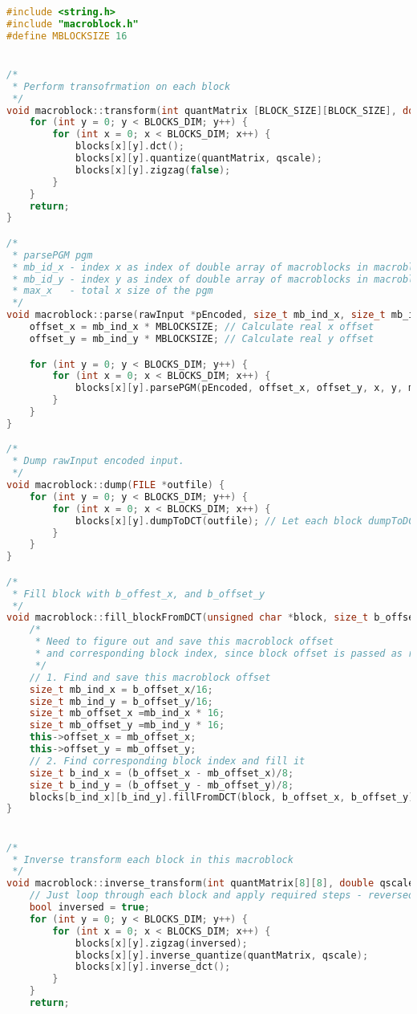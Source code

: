 \documentclass{report}
\begin{document}
\begin{lstlisting}[language=C++]
#include <string.h>
#include "macroblock.h"
#define MBLOCKSIZE 16


/*
 * Perform transofrmation on each block
 */
void macroblock::transform(int quantMatrix [BLOCK_SIZE][BLOCK_SIZE], double qscale) {
    for (int y = 0; y < BLOCKS_DIM; y++) {
        for (int x = 0; x < BLOCKS_DIM; x++) {
            blocks[x][y].dct();
            blocks[x][y].quantize(quantMatrix, qscale);
            blocks[x][y].zigzag(false);
        }
    }
    return;
}

/*
 * parsePGM pgm
 * mb_id_x - index x as index of double array of macroblocks in macroblocks manager
 * mb_id_y - index y as index of double array of macroblocks in macroblocks manager
 * max_x   - total x size of the pgm
 */
void macroblock::parse(rawInput *pEncoded, size_t mb_ind_x, size_t mb_ind_y, size_t max_x) {
    offset_x = mb_ind_x * MBLOCKSIZE; // Calculate real x offset
    offset_y = mb_ind_y * MBLOCKSIZE; // Calculate real y offset

    for (int y = 0; y < BLOCKS_DIM; y++) {
        for (int x = 0; x < BLOCKS_DIM; x++) {
            blocks[x][y].parsePGM(pEncoded, offset_x, offset_y, x, y, max_x); // Let each block parsePGM its part.
        }
    }
}

/*
 * Dump rawInput encoded input.
 */
void macroblock::dump(FILE *outfile) {
    for (int y = 0; y < BLOCKS_DIM; y++) {
        for (int x = 0; x < BLOCKS_DIM; x++) {
            blocks[x][y].dumpToDCT(outfile); // Let each block dumpToDCT its part.
        }
    }
}

/*
 * Fill block with b_offest_x, and b_offset_y
 */
void macroblock::fill_blockFromDCT(unsigned char *block, size_t b_offset_x, size_t b_offset_y) {
    /*
     * Need to figure out and save this macroblock offset
     * and corresponding block index, since block offset is passed as real offset
     */
    // 1. Find and save this macroblock offset
    size_t mb_ind_x = b_offset_x/16;
    size_t mb_ind_y = b_offset_y/16;
    size_t mb_offset_x =mb_ind_x * 16;
    size_t mb_offset_y =mb_ind_y * 16;
    this->offset_x = mb_offset_x;
    this->offset_y = mb_offset_y;
    // 2. Find corresponding block index and fill it
    size_t b_ind_x = (b_offset_x - mb_offset_x)/8;
    size_t b_ind_y = (b_offset_y - mb_offset_y)/8;
    blocks[b_ind_x][b_ind_y].fillFromDCT(block, b_offset_x, b_offset_y);
}


/*
 * Inverse transform each block in this macroblock
 */
void macroblock::inverse_transform(int quantMatrix[8][8], double qscale) {
    // Just loop through each block and apply required steps - reversed zigzag, quantize, dct
    bool inversed = true;
    for (int y = 0; y < BLOCKS_DIM; y++) {
        for (int x = 0; x < BLOCKS_DIM; x++) {
            blocks[x][y].zigzag(inversed);
            blocks[x][y].inverse_quantize(quantMatrix, qscale);
            blocks[x][y].inverse_dct();
        }
    }
    return;


\end{lstlisting}
\end{document}
